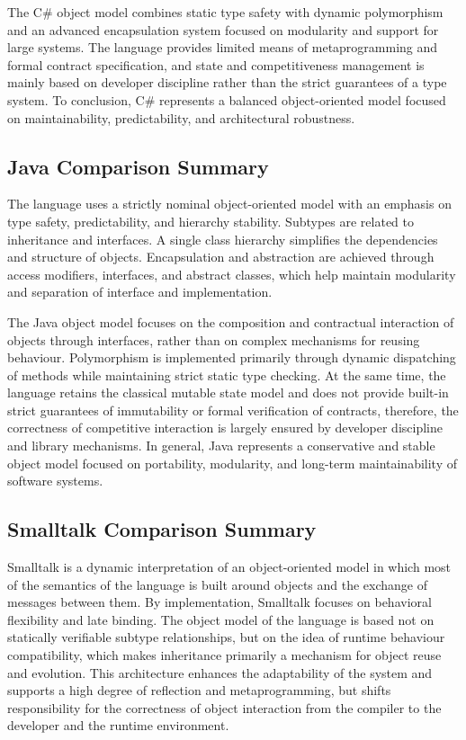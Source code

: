The C\# object model combines static type safety with dynamic polymorphism and an advanced encapsulation system focused on modularity and support for large systems. The language provides limited means of metaprogramming and formal contract specification, and state and competitiveness management is mainly based on developer discipline rather than the strict guarantees of a type system. To conclusion, C\# represents a balanced object-oriented model focused on maintainability, predictability, and architectural robustness.

\subsection{Java Comparison Summary}

The language uses a strictly nominal object-oriented model with an emphasis on type safety, predictability, and hierarchy stability. Subtypes are related to inheritance and interfaces. A single class hierarchy simplifies the dependencies and structure of objects. Encapsulation and abstraction are achieved through access modifiers, interfaces, and abstract classes, which help maintain modularity and separation of interface and implementation.

The Java object model focuses on the composition and contractual interaction of objects through interfaces, rather than on complex mechanisms for reusing behaviour. Polymorphism is implemented primarily through dynamic dispatching of methods while maintaining strict static type checking. At the same time, the language retains the classical mutable state model and does not provide built-in strict guarantees of immutability or formal verification of contracts, therefore, the correctness of competitive interaction is largely ensured by developer discipline and library mechanisms. In general, Java represents a conservative and stable object model focused on portability, modularity, and long-term maintainability of software systems.

\subsection{Smalltalk Comparison Summary}

Smalltalk is a dynamic interpretation of an object-oriented model in which most of the semantics of the language is built around objects and the exchange of messages between them. By implementation, Smalltalk focuses on behavioral flexibility and late binding. The object model of the language is based not on statically verifiable subtype relationships, but on the idea of runtime behaviour compatibility, which makes inheritance primarily a mechanism for object reuse and evolution. This architecture enhances the adaptability of the system and supports a high degree of reflection and metaprogramming, but shifts responsibility for the correctness of object interaction from the compiler to the developer and the runtime environment.

